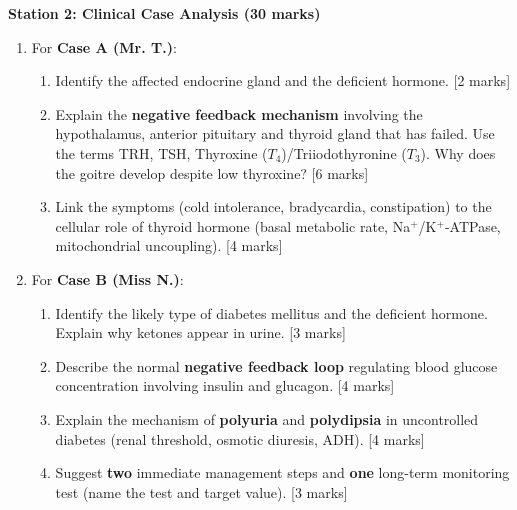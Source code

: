 \documentclass[11pt]{article}
\begin{document}
\textbf{Station 2: Clinical Case Analysis (30 marks)}
\begin{enumerate}
    \item For \textbf{Case A (Mr. T.)}:
    \begin{enumerate}
        \item Identify the affected endocrine gland and the deficient hormone. [2 marks]
        \item Explain the \textbf{negative feedback mechanism} involving the hypothalamus, anterior pituitary and thyroid gland that has failed. Use the terms TRH, TSH, Thyroxine ($T_4$)/Triiodothyronine ($T_3$). Why does the goitre develop despite low thyroxine? [6 marks]
        \item Link the symptoms (cold intolerance, bradycardia, constipation) to the cellular role of thyroid hormone (basal metabolic rate, Na$^+$/K$^+$-ATPase, mitochondrial uncoupling). [4 marks]
    \end{enumerate}
    \item For \textbf{Case B (Miss N.)}:
    \begin{enumerate}
        \item Identify the likely type of diabetes mellitus and the deficient hormone. Explain why ketones appear in urine. [3 marks]
        \item Describe the normal \textbf{negative feedback loop} regulating blood glucose concentration involving insulin and glucagon. [4 marks]
        \item Explain the mechanism of \textbf{polyuria} and \textbf{polydipsia} in uncontrolled diabetes (renal threshold, osmotic diuresis, ADH). [4 marks]
        \item Suggest \textbf{two} immediate management steps and \textbf{one} long-term monitoring test (name the test and target value). [3 marks]
    \end{enumerate}
\end{enumerate}
\end{document}
